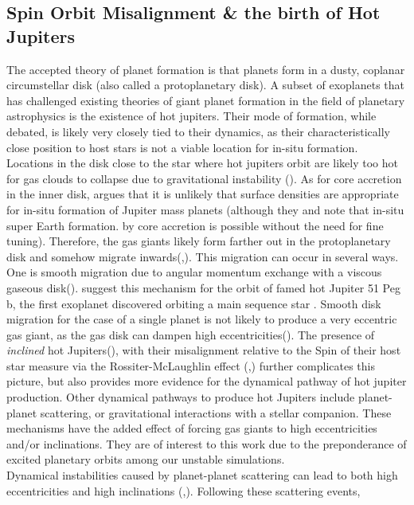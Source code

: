 \documentclass{aastex631}
\begin{document}
\subsection{Spin Orbit Misalignment \& the birth of Hot Jupiters}
The accepted theory of planet formation is that planets form in a dusty, coplanar circumstellar disk (also called a protoplanetary
disk). A subset of exoplanets that has challenged existing theories of giant planet formation in the field of planetary astrophysics is the 
existence of hot jupiters. Their mode of formation, while debated, is likely very closely tied to their dynamics, 
as their characteristically close position to host stars is not a viable location for in-situ formation. Locations in the disk close to the star
where hot jupiters orbit are likely too hot for gas clouds to collapse due to gravitational instability (\cite{raf05}). As for core accretion in the inner disk,
\cite{lee16} argues that it is unlikely that surface densities are appropriate for in-situ formation of Jupiter mass planets (although they 
and \cite{chi13} note that in-situ super Earth formation.
by core accretion is possible without the need for fine tuning). Therefore, 
the gas giants likely form farther out in the protoplanetary disk and somehow migrate inwards(\cite{lee16},).  This migration can occur in several ways. One is 
smooth migration due to angular momentum exchange with a viscous gaseous disk(\cite{gol80}). \cite{lin96} suggest 
this mechanism for the orbit of famed hot Jupiter 51 Peg b, the first exoplanet discovered orbiting 
a main sequence star \cite{may95}. Smooth disk migration for the case of a single planet is not likely to produce a very eccentric gas giant, as the gas 
disk can dampen high eccentricities(\cite{duf15}). 
The presence of \textit{inclined} hot Jupiters(\cite{alb12}), with their misalignment relative to the Spin
of their host star measure via the Rossiter-McLaughlin effect (\cite{ros24},) further complicates this picture, but also provides more evidence for the dynamical pathway 
of hot jupiter production. 
Other dynamical pathways to produce hot Jupiters include planet-planet scattering, or gravitational interactions with a stellar companion. These mechanisms
have the added effect of forcing gas giants to high eccentricities and/or inclinations. They are of interest to this work due to the preponderance of 
excited planetary orbits among our unstable simulations.\\
\indent Dynamical instabilities caused by planet-planet scattering can lead to both high eccentricities and high inclinations (\cite{bea12},). Following these scattering events,
\end{document}
